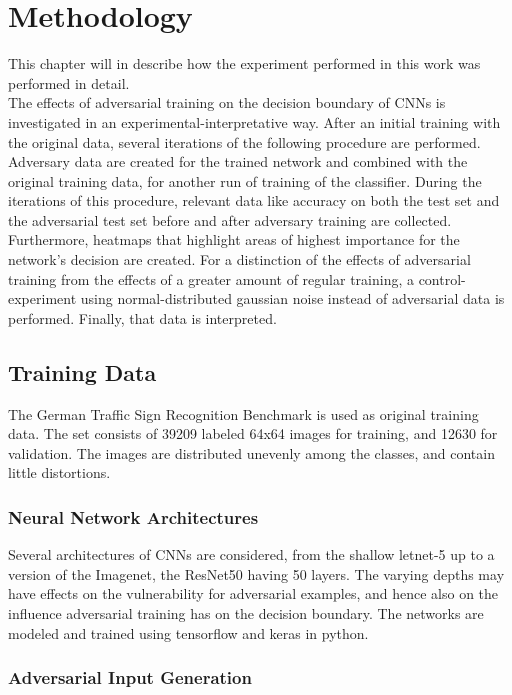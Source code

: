 \documentclass[draft,final]{vutinfth} %
\begin{document}
\chapter{Methodology}

This chapter will in describe how the experiment performed in this work was performed in detail. \\
The effects of adversarial training on the decision boundary of CNNs is investigated in an experimental-interpretative way.
After an initial training with the original data, several iterations of the following procedure are performed.
Adversary data are created for the trained network and combined with the original training data, for another run of training of the classifier.
During the iterations of this procedure, relevant data like accuracy on both the test set and the adversarial test set before and after adversary training are collected. 
Furthermore, heatmaps that highlight areas of highest importance for the network's decision are created.
For a distinction of the effects of adversarial training from the effects of a greater amount of regular training, a control-experiment using normal-distributed gaussian noise instead of adversarial data is performed.
Finally, that data is interpreted.

\section{Training Data}

The German Traffic Sign Recognition Benchmark is used as original training data. The set consists of 39209 labeled 64x64 images for training, and 12630 for validation. The images are distributed unevenly among the classes, and contain little distortions.

\subsection{Neural Network Architectures}

Several architectures of CNNs are considered, from the shallow letnet-5 up to a version of the Imagenet, the ResNet50 having 50 layers. The varying depths may have effects on the vulnerability for adversarial examples, and hence also on the influence adversarial training has on the decision boundary. The networks are modeled and trained using tensorflow and keras in python.

\subsection{Adversarial Input Generation}
\end{document}
